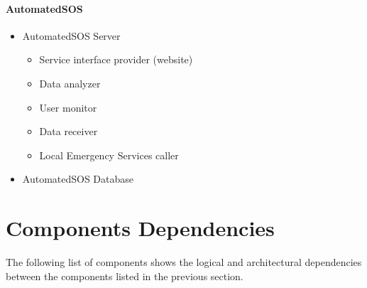 		\paragraph{AutomatedSOS}
		\begin{itemize}
			\item{AutomatedSOS Server}
				\begin{itemize}
					\item{Service interface provider (website)}
					\item{Data analyzer}
					\item{User monitor}
					\item{Data receiver}
					\item{Local Emergency Services caller}
				\end{itemize}
			\item{AutomatedSOS Database}
		\end{itemize}

	\section{Components Dependencies}
		The following list of components shows the logical and architectural dependencies between the components listed in the previous section.
